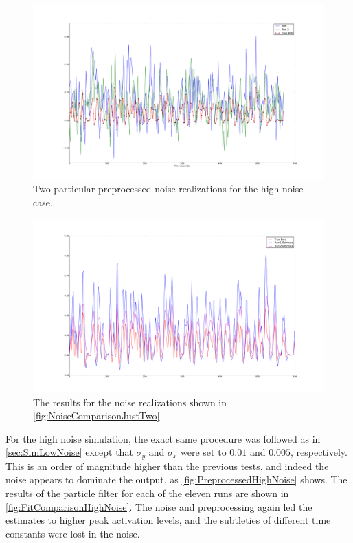\begin{figure}
\includegraphics[clip=true,trim=6cm 2cm 5cm 3.5cm,width=15cm]{images/highnoise_56_noise}
\caption{Two particular preprocessed noise realizations for the high noise case.}
\label{fig:NoiseComparisonJustTwo}
\end{figure}

\begin{figure}
\includegraphics[clip=true,trim=6cm 2cm 5cm 3.5cm,width=15cm]{images/comparison_highnoise_just2}
\caption{The results for the noise realizations shown in \autoref{fig:NoiseComparisonJustTwo}.}
\label{fig:FitComparisonHighNoiseJust2}
\end{figure}

For the high noise simulation, the exact same procedure was followed as in \autoref{sec:SimLowNoise}
except that $\sigma_y$ and $\sigma_x$ were set to $0.01$ and $0.005$,
respectively. This is an order of magnitude higher than the previous tests, and indeed the
noise appears to dominate the output, as \autoref{fig:PreprocessedHighNoise} shows.
The results of the particle filter
for each of the eleven runs are shown in \autoref{fig:FitComparisonHighNoise}.
The noise and preprocessing again led the estimates
to higher peak activation levels, and the subtleties of different time constants
were lost in the noise.

